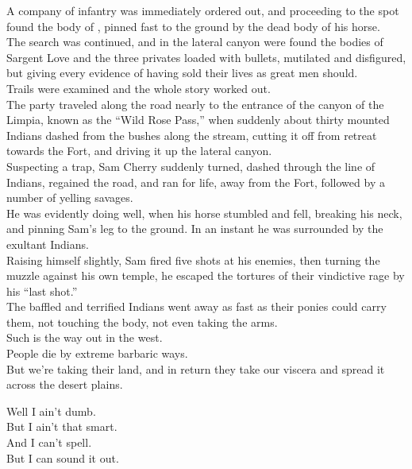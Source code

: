 A company of infantry was immediately ordered out, and proceeding to the spot found the body of , pinned fast to the ground by the dead body of his horse. \\

The search was continued, and in the lateral canyon were found the bodies of Sargent Love and the three privates loaded with bullets, mutilated and disfigured, but giving every evidence of having sold their lives as great men should. \\

Trails were examined and the whole story worked out. \\

The party traveled along the road nearly to the entrance of the canyon of the Limpia, known as the ``Wild Rose Pass,'' when suddenly about thirty mounted Indians dashed from the bushes along the stream, cutting it off from retreat towards the Fort, and driving it up the lateral canyon. \\

Suspecting a trap, Sam Cherry suddenly turned, dashed through the line of Indians, regained the road, and ran for life, away from the Fort, followed by a number of yelling savages. \\
He was evidently doing well, when his horse stumbled and fell, breaking his neck, and pinning Sam's leg to the ground. In an instant he was surrounded by the exultant Indians. \\

Raising himself slightly, Sam fired five shots at his enemies, then turning the muzzle against his own temple, he escaped the tortures of their vindictive rage by his ``last shot.'' \\
The baffled and terrified Indians went away as fast as their ponies could carry them, not touching the body, not even taking the arms. \\

Such is the way out in the west. \\
People die by extreme barbaric ways. \\
But we're taking their land, and in return they take our viscera and spread it across the desert plains. \\




Well I ain't dumb. \\
But I ain't that smart. \\
And I can't spell. \\
But I can sound it out. \\


